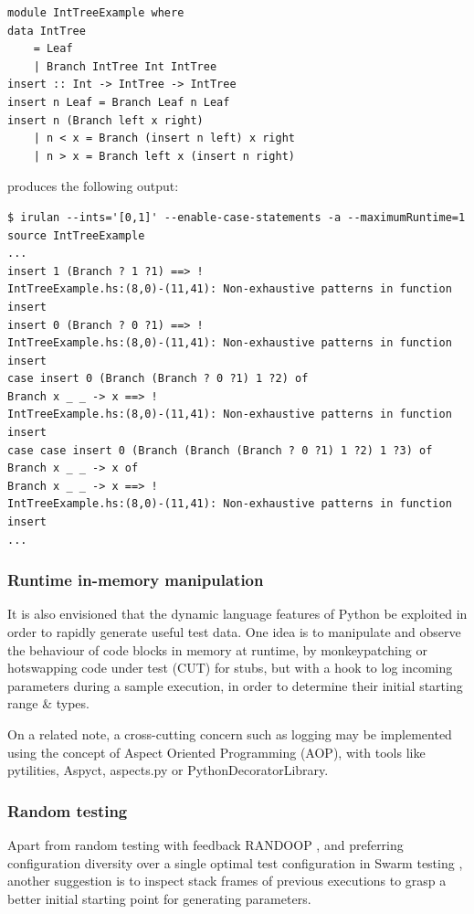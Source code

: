 \documentclass{icldt}
\numberwithin{equation}{section}       %
\begin{document}
{\begin{lstlisting}[language=HaskellUlisses,frame=single]
module IntTreeExample where
data IntTree
	= Leaf
	| Branch IntTree Int IntTree
insert :: Int -> IntTree -> IntTree
insert n Leaf = Branch Leaf n Leaf
insert n (Branch left x right)
	| n < x = Branch (insert n left) x right
	| n > x = Branch left x (insert n right)
\end{lstlisting}
produces the following output:
\begin{lstlisting}[language=HaskellUlisses,frame=single]
$ irulan --ints='[0,1]' --enable-case-statements -a --maximumRuntime=1 source IntTreeExample
...
insert 1 (Branch ? 1 ?1) ==> !
IntTreeExample.hs:(8,0)-(11,41): Non-exhaustive patterns in function insert
insert 0 (Branch ? 0 ?1) ==> !
IntTreeExample.hs:(8,0)-(11,41): Non-exhaustive patterns in function insert
case insert 0 (Branch (Branch ? 0 ?1) 1 ?2) of
Branch x _ _ -> x ==> !
IntTreeExample.hs:(8,0)-(11,41): Non-exhaustive patterns in function insert
case case insert 0 (Branch (Branch (Branch ? 0 ?1) 1 ?2) 1 ?3) of
Branch x _ _ -> x of
Branch x _ _ -> x ==> !
IntTreeExample.hs:(8,0)-(11,41): Non-exhaustive patterns in function insert
...
\end{lstlisting}

\subsubsection{Runtime in-memory manipulation}
It is also envisioned that the dynamic language features of Python be exploited in order to rapidly generate useful test data. One idea is to manipulate and observe the behaviour of code blocks in memory at runtime, by monkeypatching or hotswapping code under test (CUT) for stubs, but with a hook to log incoming parameters during a sample execution, in order to determine their initial starting range \& types.

On a related note, a cross-cutting concern such as logging may be implemented using the concept of Aspect Oriented Programming (AOP), with tools like \textsf{pytilities}, \textsf{Aspyct}, \textsf{aspects.py} or \textsf{PythonDecoratorLibrary}.

\subsubsection{Random testing}
Apart from random testing with feedback RANDOOP \cite{Pacheco2007}, and preferring configuration diversity over a single optimal test configuration in Swarm testing \cite{AlexGroceSep2011}, another suggestion is to inspect stack frames of previous executions to grasp a better initial starting point for generating parameters.
}
\end{document}

